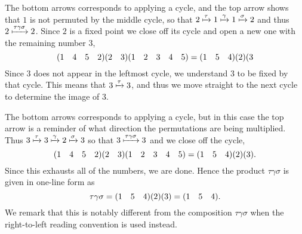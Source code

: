 \begin{example}
    \begin{figure}[h]
        \centering
    \end{figure}

    The bottom arrows corresponds to applying a cycle, and the top arrow shows that $1$ is not permuted by the middle cycle, so that $2 \xmapsto{\tau} 1 \xmapsto{\gamma} 1 \xmapsto{\sigma} 2$ and thus $2 \xmapsto{\tau\gamma\sigma} 2$. Since $2$ is a fixed point we close off its cycle and open a new one with the remaining number $3$,
    \[
    (1 \quad 4 \quad 5 \quad 2)(2 \quad 3)(1 \quad 2 \quad 3 \quad 4 \quad 5) = (1 \quad 5 \quad 4)(2)(3
    \]
    Since $3$ does not appear in the leftmost cycle, we understand $3$ to be fixed by that cycle. This means that $3 \xmapsto{\tau} 3$, and thus we move straight to the next cycle to determine the image of $3$.

    \begin{figure}[h]
        \centering
    \end{figure}

    The bottom arrows corresponds to applying a cycle, but in this case the top arrow is a reminder of what direction the permutations are being multiplied. Thus $3 \xmapsto{\tau} 3 \xmapsto{\gamma} 2 \xmapsto{\sigma} 3$ so that $3 \xmapsto{\tau\gamma\sigma} 3$ and we close off the cycle,
    \[
    (1 \quad 4 \quad 5 \quad 2)(2 \quad 3)(1 \quad 2 \quad 3 \quad 4 \quad 5) = (1 \quad 5 \quad 4)(2)(3).
    \]
    Since this exhausts all of the numbers, we are done. Hence the product $\tau\gamma\sigma$ is given in one-line form as
    \[
    \tau\gamma\sigma = (1 \quad 5 \quad 4)(2)(3) = (1 \quad 5 \quad 4).
    \]
    We remark that this is notably different from the composition $\tau\gamma\sigma$ when the right-to-left reading convention is used instead.
\end{example}


